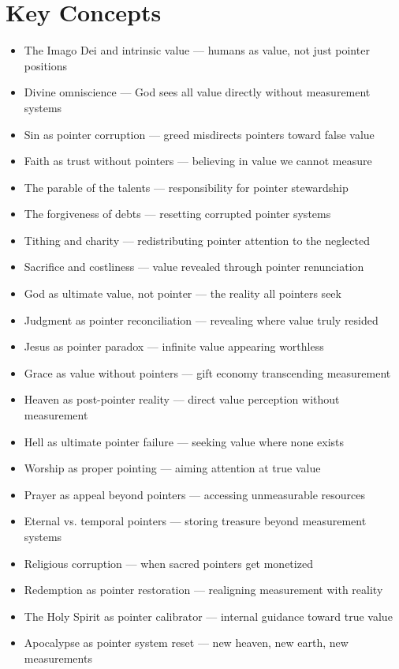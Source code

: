 \documentclass[11pt,oneside]{book}
\begin{document}
\section{Key Concepts}

\begin{itemize}
\item The Imago Dei and intrinsic value — humans as value, not just pointer positions
\item Divine omniscience — God sees all value directly without measurement systems
\item Sin as pointer corruption — greed misdirects pointers toward false value
\item Faith as trust without pointers — believing in value we cannot measure
\item The parable of the talents — responsibility for pointer stewardship
\item The forgiveness of debts — resetting corrupted pointer systems
\item Tithing and charity — redistributing pointer attention to the neglected
\item Sacrifice and costliness — value revealed through pointer renunciation
\item God as ultimate value, not pointer — the reality all pointers seek
\item Judgment as pointer reconciliation — revealing where value truly resided
\item Jesus as pointer paradox — infinite value appearing worthless
\item Grace as value without pointers — gift economy transcending measurement
\item Heaven as post-pointer reality — direct value perception without measurement
\item Hell as ultimate pointer failure — seeking value where none exists
\item Worship as proper pointing — aiming attention at true value
\item Prayer as appeal beyond pointers — accessing unmeasurable resources
\item Eternal vs. temporal pointers — storing treasure beyond measurement systems
\item Religious corruption — when sacred pointers get monetized
\item Redemption as pointer restoration — realigning measurement with reality
\item The Holy Spirit as pointer calibrator — internal guidance toward true value
\item Apocalypse as pointer system reset — new heaven, new earth, new measurements
\end{itemize}
\end{document}
